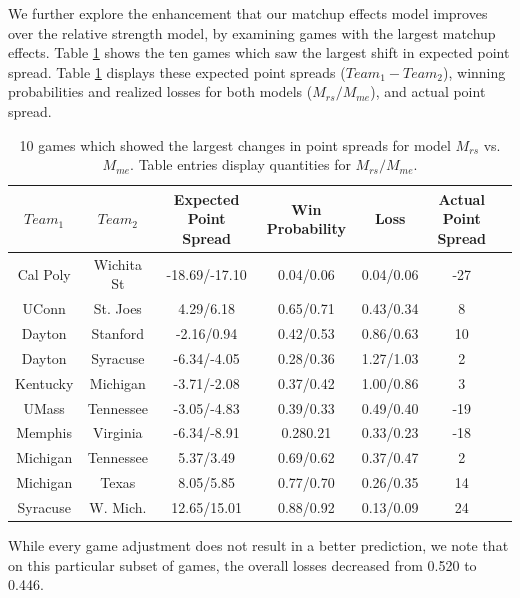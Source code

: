 \documentclass[letterpaper,12pt]{article}
\begin{document}
We further explore the enhancement that our matchup effects model improves over the relative strength model, by examining games with the largest matchup effects. Table \ref{tab:change} shows the ten games which saw the largest shift in expected point spread. Table \ref{tab:change} displays these expected point spreads ($Team_1 - Team_2$), winning probabilities and realized losses for both models ($M_{rs}/M_{me}$), and actual point spread. 
\begin{table}[h!]
\caption{10 games which showed the largest changes in point spreads for model $M_{rs}$ vs. $M_{me}$. Table entries display quantities for $M_{rs}/M_{me}$.\label{tab:change}}
\scriptsize
\centering
\begin{tabular}{|cc | ccc |c|c|}
  \hline
  \hline
 $Team_1$ & $Team_2$ & Expected Point Spread & Win Probability & Loss & Actual Point Spread\\ 
  \hline
 Cal Poly & Wichita St & -18.69/-17.10  & 0.04/0.06 & 0.04/0.06&  -27\\ 
 UConn & St. Joes &4.29/6.18 & 0.65/0.71 & 0.43/0.34  & 8\\ 
 Dayton & Stanford & -2.16/0.94 & 0.42/0.53 & 0.86/0.63& 10 \\ 
 Dayton & Syracuse & -6.34/-4.05 & 0.28/0.36 & 1.27/1.03& 2\\ 
 Kentucky & Michigan & -3.71/-2.08 & 0.37/0.42 & 1.00/0.86 & 3\\ 
 UMass & Tennessee &-3.05/-4.83 & 0.39/0.33 & 0.49/0.40 & -19\\ 
 Memphis & Virginia & -6.34/-8.91 & 0.280.21 & 0.33/0.23 & -18\\ 
 Michigan & Tennessee & 5.37/3.49 & 0.69/0.62 & 0.37/0.47 & 2\\ 
 Michigan & Texas & 8.05/5.85 & 0.77/0.70 & 0.26/0.35 & 14\\ 
 Syracuse & W. Mich. & 12.65/15.01 & 0.88/0.92 & 0.13/0.09& 24\\ 
   \hline
   \hline
\end{tabular}
\end{table}
While every game adjustment does not result in a better prediction,  we note that on this particular subset of games, the overall losses decreased from 0.520 to 0.446. 
\end{document}
